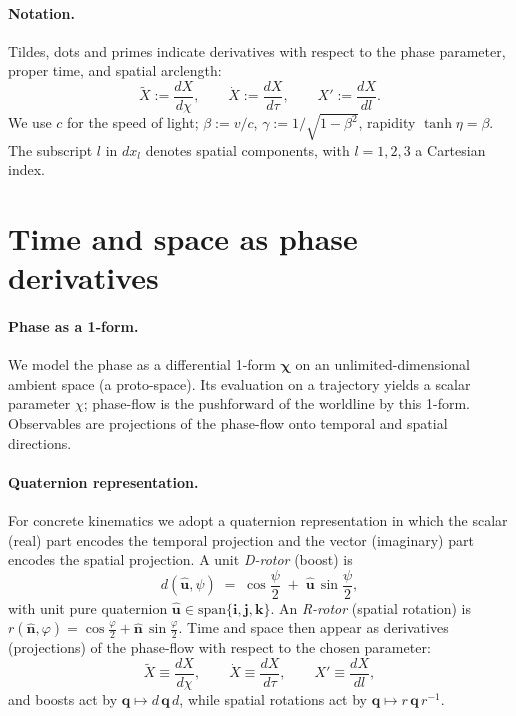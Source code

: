 \documentclass[11pt]{article}
\numberwithin{equation}{section}
\providecommand{\bi}{\mathbf{i}}
\providecommand{\bj}{\mathbf{j}}
\providecommand{\bk}{\mathbf{k}}
\begin{document}
\paragraph{Notation.}
Tildes, dots and primes indicate derivatives with respect to the phase parameter, proper time, and spatial arclength:
\begin{equation}
\tilde X := \frac{dX}{d\chi},\qquad \dot X := \frac{dX}{d\tau},\qquad X' := \frac{dX}{dl}.
\end{equation}
We use $c$ for the speed of light; $\beta := v/c$, $\gamma := 1/\sqrt{1-\beta^2}$, rapidity $\tanh \eta = \beta$.
The subscript $l$ in $dx_l$ denotes spatial components, with $l=1,2,3$ a Cartesian index.

\section{Time and space as phase derivatives}

\paragraph{Phase as a 1-form.}
We model the phase as a differential 1-form $\boldsymbol{\chi}$ on an unlimited-dimensional
ambient space (a proto-space). Its evaluation on a trajectory yields a scalar parameter $\chi$; phase-flow
is the pushforward of the worldline by this 1-form. Observables are projections of the phase-flow
onto temporal and spatial directions.

\paragraph{Quaternion representation.}
For concrete kinematics we adopt a quaternion representation in which the scalar (real) part
encodes the temporal projection and the vector (imaginary) part encodes the spatial projection.
A unit \emph{D-rotor} (boost) is
\begin{equation}
d(\hat{\mathbf u},\psi)\;=\;\cos\frac{\psi}{2}\;+\;\hat{\mathbf u}\,\sin\frac{\psi}{2},
\end{equation}
with unit pure quaternion $\hat{\mathbf u}\in\mathrm{span}\{\bi,\bj,\bk\}$. An \emph{R-rotor} (spatial
rotation) is $r(\hat{\mathbf n},\varphi)=\cos\frac{\varphi}{2}+\hat{\mathbf n}\,\sin\frac{\varphi}{2}$.
Time and space then appear as derivatives (projections) of the phase-flow with respect to the
chosen parameter:
\begin{equation}
\tilde X \equiv \frac{dX}{d\chi},\qquad \dot X \equiv \frac{dX}{d\tau},\qquad X' \equiv \frac{dX}{dl},
\end{equation}
and boosts act by $ \mathbf q\mapsto d\,\mathbf q\,d$, while spatial rotations act by
$\mathbf q\mapsto r\,\mathbf q\,r^{-1}$.
\end{document}
